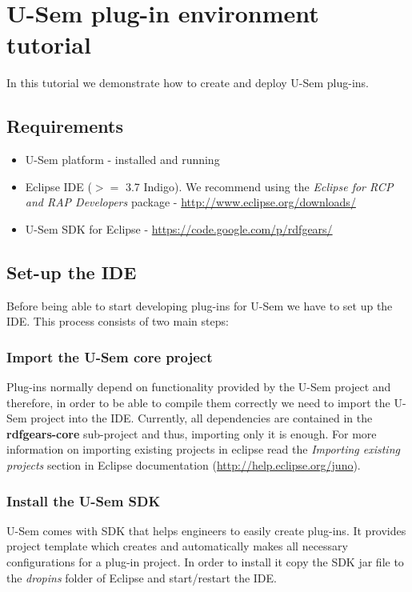 \chapter{U-Sem plug-in environment tutorial} 
\label{cha:tutorial}

In this tutorial we demonstrate how to create and deploy U-Sem plug-ins. 

\section{Requirements}

\begin{itemize}
	\item U-Sem platform - installed and running
	\item Eclipse IDE ($>=$ 3.7 Indigo). We recommend using the \textit{Eclipse for RCP and RAP Developers} package - \url{http://www.eclipse.org/downloads/}
	\item U-Sem SDK for Eclipse - \url{https://code.google.com/p/rdfgears/}
\end{itemize}

\section{Set-up the IDE}

Before being able to start developing plug-ins for U-Sem we have to set up the IDE. This process consists of two main steps:

\subsection{Import the U-Sem core project}

Plug-ins normally depend on functionality provided by the U-Sem project and therefore, in order to be able to compile them correctly we need to import the U-Sem project into the IDE. Currently, all dependencies are contained in the \textbf{rdfgears-core} sub-project and thus, importing only it is enough. For more information on importing existing projects in eclipse read the \textit{Importing existing projects} section in Eclipse documentation (\url{http://help.eclipse.org/juno}).

\subsection{Install the U-Sem SDK}
U-Sem comes with SDK that helps engineers to easily create plug-ins. It provides project template which creates and automatically makes all necessary configurations for a plug-in project. In order to install it copy the SDK jar file to the \textit{dropins} folder of Eclipse and start/restart the IDE. 

